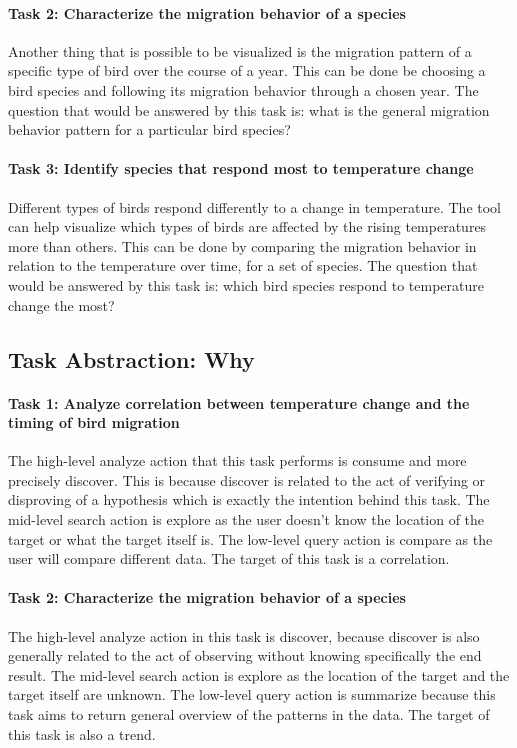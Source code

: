 \documentclass[journal]{vgtc}                %
\begin{document}
\paragraph{Task 2: Characterize the migration behavior of a species} Another thing that is possible to be visualized is the migration pattern of a specific type of bird over the course of a year. This can be done be choosing a bird species and following its migration behavior through a chosen year. The question that would be answered by this task is: what is the general migration behavior pattern for a particular bird species?

\paragraph{Task 3: Identify species that respond most to temperature change} Different types of birds respond differently to a change in temperature. The tool can help visualize which types of birds are affected by the rising temperatures more than others. This can be done by comparing the migration behavior in relation to the temperature over time, for a set of species. The question that would be answered by this task is: which bird species respond to temperature change the most?

\subsection{Task Abstraction: Why}

\paragraph{Task 1: Analyze correlation between temperature change and the timing of bird migration} The high-level analyze action that this task performs is consume and more precisely discover. This is because discover is related to the act of verifying or disproving of a hypothesis which is exactly the intention behind this task. The mid-level search action is explore as the user doesn't know the location of the target or what the target itself is. The low-level query action is compare as the user will compare different data. The target of this task is a correlation.

\paragraph{Task 2: Characterize the migration behavior of a species} The high-level analyze action in this task is discover, because discover is also generally related to the act of observing without knowing specifically the end result. The mid-level search action is explore as the location of the target and the target itself are unknown. The low-level query action is summarize because this task aims to return general overview of the patterns in the data. The target of this task is also a trend.
\end{document}
